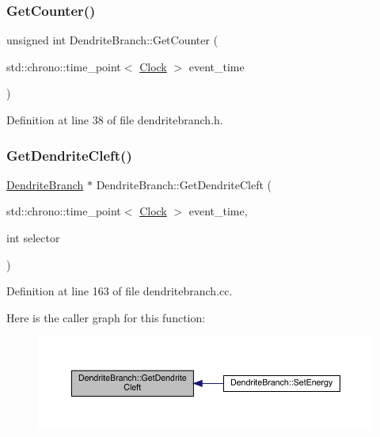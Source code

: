 \subsubsection{\texorpdfstring{Get\+Counter()}{GetCounter()}}
{\footnotesize\ttfamily unsigned int Dendrite\+Branch\+::\+Get\+Counter (\begin{DoxyParamCaption}\item[{std\+::chrono\+::time\+\_\+point$<$ \hyperlink{universe_8h_a0ef8d951d1ca5ab3cfaf7ab4c7a6fd80}{Clock} $>$}]{event\+\_\+time }\end{DoxyParamCaption})\hspace{0.3cm}{\ttfamily [inline]}}



Definition at line 38 of file dendritebranch.\+h.

\mbox{\label{class_dendrite_branch_a11f25ffce77011afad909acb593d2e42}} 
\subsubsection{\texorpdfstring{Get\+Dendrite\+Cleft()}{GetDendriteCleft()}}
{\footnotesize\ttfamily \hyperlink{class_dendrite_branch}{Dendrite\+Branch} $\ast$ Dendrite\+Branch\+::\+Get\+Dendrite\+Cleft (\begin{DoxyParamCaption}\item[{std\+::chrono\+::time\+\_\+point$<$ \hyperlink{universe_8h_a0ef8d951d1ca5ab3cfaf7ab4c7a6fd80}{Clock} $>$}]{event\+\_\+time,  }\item[{int}]{selector }\end{DoxyParamCaption})}



Definition at line 163 of file dendritebranch.\+cc.

Here is the caller graph for this function\+:
\nopagebreak
\begin{figure}[H]
\begin{center}
\leavevmode
\includegraphics[width=350pt]{class_dendrite_branch_a11f25ffce77011afad909acb593d2e42_icgraph}
\end{center}
\end{figure}
\mbox{\label{class_dendrite_branch_a2be44a81b4b5213947e9545400a0453c}} 
